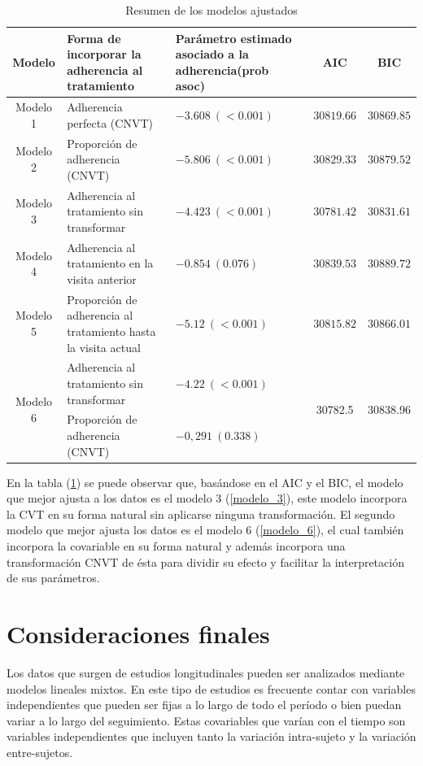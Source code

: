 \documentclass[spanish]{article}
\numberwithin{figure}{subsection}
\numberwithin{equation}{subsection}
\numberwithin{table}{subsection}
\begin{document}
\begin{table}[H]
	\centering
	\caption{Resumen de los modelos ajustados}
	\label{comparacion}
	\begin{tabular}{|c|p{5cm}|p{5cm}|c|c|}
		\hline
		Modelo & Forma de incorporar la adherencia al tratamiento & Parámetro estimado asociado a la adherencia(prob asoc) & AIC & BIC \\
		\hline
		Modelo 1 & Adherencia perfecta (CNVT) & $-3.608\ (<0.001)$ & $30819.66$ & $30869.85$ \\
		\hline
		Modelo 2 & Proporción de adherencia (CNVT) & $-5.806\ (<0.001)$ & $30829.33$ & $30879.52$ \\
		\hline
		Modelo 3 & Adherencia al tratamiento sin transformar & $-4.423\ (<0.001) $ & $30781.42$ & $30831.61$ \\
		\hline
		Modelo 4 & Adherencia al tratamiento en la visita anterior & $-0.854\ (0.076)$ & $30839.53$ & $30889.72$ \\
		\hline
		Modelo 5 & Proporción de adherencia al tratamiento hasta la visita actual & $-5.12\ (<0.001)$ & $30815.82$ & $30866.01$ \\
		\hline
		\multirow{2}{*}{Modelo 6}
		& Adherencia al tratamiento sin transformar & $-4.22\ (<0.001)$ & \multirow{2}{*}{30782.5} & \multirow{2}{*}{30838.96} \\
		\cline{2-3}
		& Proporción de adherencia (CNVT) & $-0,291\ (0.338)$ & & \\
		\hline
	\end{tabular}
\end{table}

En la tabla (\ref{comparacion}) se puede observar que, basándose en el AIC y el
BIC, el modelo que mejor ajusta a los datos es el modelo 3 (\ref{modelo_3}),
este modelo incorpora la CVT en su forma natural sin aplicarse ninguna
transformación. El segundo modelo que mejor ajusta los datos es el modelo 6
(\ref{modelo_6}), el cual también incorpora la covariable en su forma natural y
además incorpora una transformación CNVT de ésta para dividir su efecto y
facilitar la interpretación de sus parámetros.

\newpage

\section{Consideraciones finales}

Los datos que surgen de estudios longitudinales pueden ser analizados mediante
modelos lineales mixtos. En este tipo de estudios es frecuente contar con
variables independientes que pueden ser fijas a lo largo de todo el período o
bien puedan variar a lo largo del seguimiento. Estas covariables que varían con
el tiempo son variables independientes que incluyen tanto la variación
intra-sujeto y la variación entre-sujetos.
\end{document}
